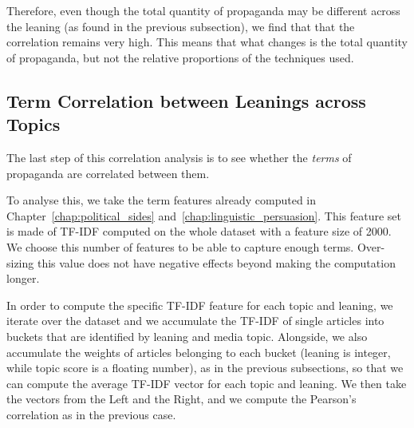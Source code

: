 Therefore, even though the total quantity of propaganda may be different across the leaning (as found in the previous subsection), we find that that the correlation remains very high.
This means that what changes is the total quantity of propaganda, but not the relative proportions of the techniques used.

\subsection{\statusgreen Term Correlation between Leanings across Topics}
\label{ssec:topic_propaganda_leaning_terms}

The last step of this correlation analysis is to see whether the \emph{terms} of propaganda are correlated between them.

To analyse this, we take the term features already computed in Chapter~\ref{chap:political_sides} and~\ref{chap:linguistic_persuasion}.
This feature set is made of TF-IDF computed on the whole dataset with a feature size of 2000.
We choose this number of features to be able to capture enough terms. Over-sizing this value does not have negative effects beyond making the computation longer.

In order to compute the specific TF-IDF feature for each topic and leaning, we iterate over the dataset and we accumulate the TF-IDF of single articles into buckets that are identified by leaning and media topic.
Alongside, we also accumulate the weights of articles belonging to each bucket (leaning is integer, while topic score is a floating number), as in the previous subsections, so that we can compute the average TF-IDF vector for each topic and leaning.
We then take the vectors from the Left and the Right, and we compute the Pearson's correlation as in the previous case.


